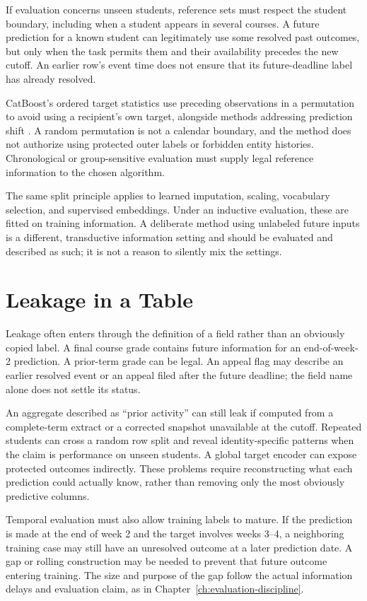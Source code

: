 If evaluation concerns unseen students, reference sets must respect the student boundary, including when a student appears in several courses. A future prediction for a known student can legitimately use some resolved past outcomes, but only when the task permits them and their availability precedes the new cutoff. An earlier row's event time does not ensure that its future-deadline label has already resolved.

CatBoost's ordered target statistics use preceding observations in a permutation to avoid using a recipient's own target, alongside methods addressing prediction shift \citep{prokhorenkova2018catboost}. A random permutation is not a calendar boundary, and the method does not authorize using protected outer labels or forbidden entity histories. Chronological or group-sensitive evaluation must supply legal reference information to the chosen algorithm.

The same split principle applies to learned imputation, scaling, vocabulary selection, and supervised embeddings. Under an inductive evaluation, these are fitted on training information. A deliberate method using unlabeled future inputs is a different, transductive information setting and should be evaluated and described as such; it is not a reason to silently mix the settings.

\section{Leakage in a Table}
\label{sec:tabular-leakage}

Leakage often enters through the definition of a field rather than an obviously copied label. A final course grade contains future information for an end-of-week-2 prediction. A prior-term grade can be legal. An appeal flag may describe an earlier resolved event or an appeal filed after the future deadline; the field name alone does not settle its status.

An aggregate described as ``prior activity'' can still leak if computed from a complete-term extract or a corrected snapshot unavailable at the cutoff. Repeated students can cross a random row split and reveal identity-specific patterns when the claim is performance on unseen students. A global target encoder can expose protected outcomes indirectly. These problems require reconstructing what each prediction could actually know, rather than removing only the most obviously predictive columns.

Temporal evaluation must also allow training labels to mature. If the prediction is made at the end of week 2 and the target involves weeks 3--4, a neighboring training case may still have an unresolved outcome at a later prediction date. A gap or rolling construction may be needed to prevent that future outcome entering training. The size and purpose of the gap follow the actual information delays and evaluation claim, as in Chapter~\ref{ch:evaluation-discipline}.

